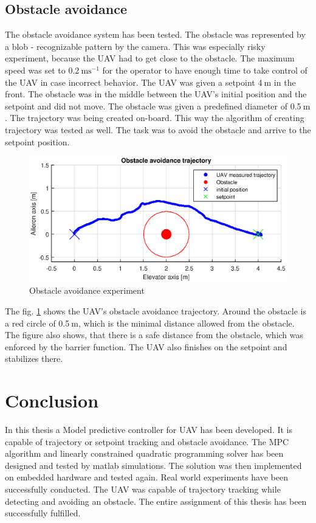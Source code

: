 \documentclass[a4paper,11pt,titlepage]{article}
\newcommand{\jed}[1]{\ensuremath{~\mathrm{#1}}}
\begin{document}
\subsection{Obstacle avoidance}
The obstacle avoidance system has been tested. The obstacle was represented by a blob - recognizable pattern by the camera. This was especially risky experiment, because the UAV had to get close to the obstacle. The maximum speed was set to 0.2\jed{ms^{-1}} for the operator to have enough time to take control of the UAV in case incorrect behavior. The UAV was given a setpoint 4\jed{m} in the front. The obstacle was in the middle between the UAV's initial position and the setpoint and did not move. The obstacle was given a predefined diameter of 0.5\jed{m}. The trajectory was being created on-board. This way the algorithm of creating trajectory was tested as well. The task was to avoid the obstacle and arrive to the setpoint position.

\begin{figure}[h]
\centering
\includegraphics[width=1\textwidth]{fig/avoidance_experiment.eps}
\caption{Obstacle avoidance experiment}
\label{fig:avoidance_experiment}
\end{figure}

The fig. \ref{fig:avoidance_experiment} shows the UAV's obstacle avoidance trajectory. Around the obstacle is a red circle of 0.5\jed{m}, which is the minimal distance allowed from the obstacle. The figure also shows, that there is a safe distance from the obstacle, which was enforced by the barrier function. The UAV also finishes on the setpoint and stabilizes there.

\section{Conclusion}
In this thesis a Model predictive controller for UAV has been developed. It is capable of trajectory or setpoint tracking and obstacle avoidance. The MPC algorithm and linearly constrained quadratic programming solver has been designed and tested by matlab simulations. The solution was then implemented on embedded hardware and tested again. Real world experiments have been successfully conducted. The UAV was capable of trajectory tracking while detecting and avoiding an obstacle. The entire assignment of this thesis has been successfully fulfilled.
\end{document}
